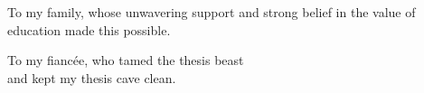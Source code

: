 \thispagestyle{empty}

\vspace*{3cm}

\begin{center}
To my family, whose unwavering support and strong belief in the value of education made this possible.
\end{center}

\medskip

\begin{center}
To my fianc\'{e}e, who tamed the thesis beast \\
and kept my thesis cave clean.
\end{center}



